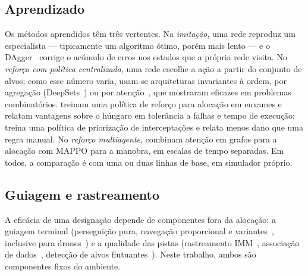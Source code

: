 \documentclass[11pt,a4paper]{article}
\begin{document}
\subsection{Aprendizado}
Os métodos aprendidos têm três vertentes. Na \emph{imitação}, uma rede reproduz um especialista --- tipicamente um
algoritmo ótimo, porém mais lento --- e o DAgger~\cite{ross2011} corrige o acúmulo de erros nos estados que a própria rede
visita. No \emph{reforço com política centralizada}, uma rede escolhe a ação a partir do conjunto de alvos; como esse
número varia, usam-se arquiteturas invariantes à ordem, por agregação (DeepSets~\cite{zaheer2017}) ou por
atenção~\cite{vaswani2017}, que \citet{kool2019} mostraram eficazes em problemas combinatórios. \citet{liu2023drones}
treinam uma política de reforço para alocação em enxames e relatam vantagens sobre o húngaro em tolerância a falhas e
tempo de execução; \citet{palmas2025} treina uma política de priorização de interceptações e relata menos dano que uma
regra manual. No \emph{reforço multiagente}, \citet{jia2026} combinam atenção em grafos para a alocação com MAPPO para a
manobra, em escalas de tempo separadas. Em todos, a comparação é com uma ou duas linhas de base, em simulador próprio.

\subsection{Guiagem e rastreamento}
A eficácia de uma designação depende de componentes fora da alocação: a guiagem terminal (perseguição pura, navegação
proporcional e variantes~\cite{shneydor1998,zarchan2012,palumbo2010}, inclusive para drones~\cite{pliska2024}) e a
qualidade das pistas (rastreamento IMM~\cite{blom1988}, associação de dados~\cite{barshalom2001}, detecção de alvos
flutuantes~\cite{swerling1960}). Neste trabalho, ambos são componentes fixos do ambiente.
\end{document}
